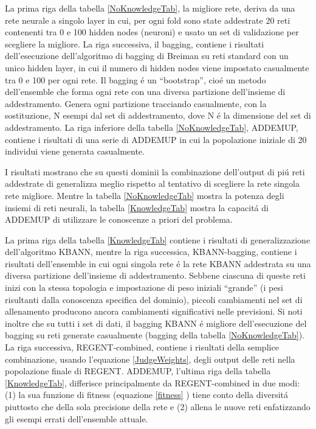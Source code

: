 \documentclass[a4paper,12pt]{report}
\begin{document}
  La prima riga della tabella \ref{NoKnowledgeTab}, la migliore rete, deriva da una rete neurale a singolo layer in cui, per ogni fold sono state addestrate 20 reti contenenti tra 0 e 100 hidden nodes (neuroni) e usato un set di validazione per scegliere la migliore. 
  La riga successiva, il bagging, contiene i risultati dell'esecuzione dell'algoritmo di bagging di Breiman \cite{breiman1994bagging} su reti standard con un unico hidden layer, in cui il numero di hidden nodes viene impostato casualmente tra 0 e 100 per ogni rete. 
  Il bagging \'e un ``bootstrap'', cio\'e un metodo dell'ensemble che forma ogni rete con una diversa partizione dell'insieme di addestramento. 
  Genera ogni partizione tracciando casualmente, con la sostituzione, N esempi dal set di addestramento, dove N \'e la dimensione del set di addestramento. 
  La riga inferiore della tabella \ref{NoKnowledgeTab}, ADDEMUP, contiene i risultati di una serie di ADDEMUP in cui la popolazione iniziale di 20 individui viene generata casualmente. 
  
  I risultati mostrano che su questi dominii la combinazione dell'output di pi\'u reti addestrate di generalizza meglio rispetto al tentativo di scegliere la rete singola rete migliore. 
  Mentre la tabella \ref{NoKnowledgeTab} mostra la potenza degli insiemi di reti neurali, la tabella \ref{KnowledgeTab} mostra la capacit\'a di ADDEMUP di utilizzare le conoscenze a priori del problema. 
  
  La prima riga della tabella \ref{KnowledgeTab} contiene i risultati di generalizzazione dell'algoritmo KBANN, mentre la riga successica, KBANN-bagging, contiene i risultati dell'ensemble in cui ogni singola rete \'e la rete KBANN addestrata su una diversa partizione dell'insieme di addestramento. 
  Sebbene ciascuna di queste reti inizi con la stessa topologia e impostazione di peso iniziali ``grande'' (i pesi risultanti dalla conoscenza specifica del dominio), piccoli cambiamenti nel set di allenamento producono ancora cambiamenti significativi nelle previsioni. 
  Si noti inoltre che su tutti i set di dati, il bagging KBANN \'e migliore dell'esecuzione del bagging su reti generate casualmente (bagging della tabella \ref{NoKnowledgeTab}). 
  La riga successiva, REGENT-combined, contiene i risultati della semplice combinazione, usando l'equazione \ref{JudgeWeights}, degli output delle reti nella popolazione finale di REGENT. 
  ADDEMUP, l'ultima riga della tabella \ref{KnowledgeTab}, differisce principalmente da REGENT-combined in due modi: (1) la sua funzione di fitness (equazione \ref{fitness} ) tiene conto della diversit\'a piuttosto che della sola precisione della rete e (2) allena le nuove reti enfatizzando gli esempi errati dell'ensemble attuale. 
  
\end{document}

